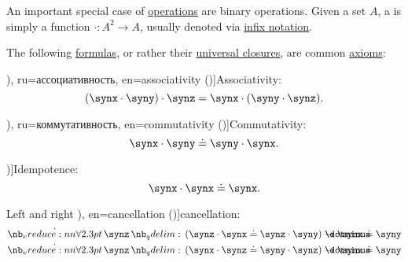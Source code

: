 \begin{definition}\label{def:binary_operation}
  An important special case of \hyperref[def:operation_on_set]{operations} are binary operations. Given a set \( A \), a  is simply a function \( \cdot: A^2 \to A \), usually denoted via \hyperref[rem:first_order_formula_conventions/infix]{infix notation}.

  The following \hyperref[def:first_order_syntax/formula]{formulas}, or rather their \hyperref[def:universal_closure]{universal closures}, are common \hyperref[def:first_order_theory/axiomatized]{axioms}:
  \begin{thmenum}
     \term[bg=асоциативност (\cite[11]{ГеновМиховскиМоллов1991Алгебра}), ru=ассоциативность, en=associativity (\cite[329]{RosenEtAl2018DiscreteMathematicsHandbook})]{Associativity}:
    \begin{equation}\label{eq:def:binary_operation/associative}
      (\synx \cdot \syny) \cdot \synz = \synx \cdot (\syny \cdot \synz).
    \end{equation}

     \term[bg=комутативност (\cite[11]{ГеновМиховскиМоллов1991Алгебра}), ru=коммутативность, en=commutativity (\cite[329]{RosenEtAl2018DiscreteMathematicsHandbook})]{Commutativity}:
    \begin{equation}\label{eq:def:binary_operation/commutative}
      \synx \cdot \syny \syneq \syny \cdot \synx.
    \end{equation}

     \term[ru=идемпотентность, en=idempotence (\cite[33]{RosenEtAl2018DiscreteMathematicsHandbook})]{Idempotence}:
    \begin{equation}\label{eq:def:binary_operation/idempotent}
      \synx \cdot \synx \syneq \synx.
    \end{equation}

     Left and right \term[ru=сокращение, bg=съкращаване (\cite[77]{ГеновМиховскиМоллов1991Алгебра}), en=cancellation (\cite[324]{RosenEtAl2018DiscreteMathematicsHandbook})]{cancellation}:
    \begin{align}
      \qforall \synz (\synz \cdot \synx \syneq \synz \cdot \syny) \synimplies \synx \syneq \syny
      \label{eq:def:binary_operation/cancellative/left}
      \\
      \qforall \synz (\synx \cdot \synz \syneq \syny \cdot \synz) \synimplies \synx \syneq \syny
      \label{eq:def:binary_operation/cancellative/right}
    \end{align}
  \end{thmenum}
\end{definition}


